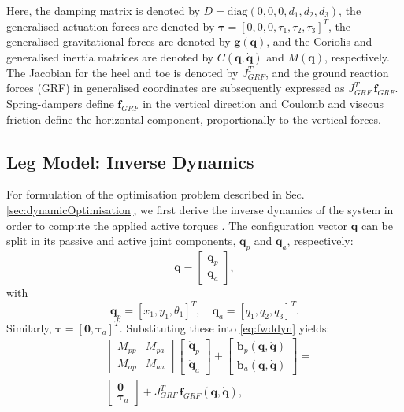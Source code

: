 \documentclass[letterpaper, 10 pt, conference]{ieeeconf}  %
\begin{document}
Here, the damping matrix is denoted by $D = \mathrm{diag} \left(0,0,0,d_1,d_2,d_3\right)$, the generalised actuation forces are denoted by $\boldsymbol{\tau} = \left[0,0,0,\tau_1,\tau_2,\tau_3\right]^T$, the generalised gravitational forces are denoted by $\mathbf{g(q)}$, and the Coriolis and generalised inertia matrices are denoted by $C\mathbf{(q, \dot q)}$ and $M(\mathbf{q})$, respectively. The Jacobian for the heel and toe is denoted by $J_{GRF}^T$, and the ground reaction forces (GRF) in generalised coordinates are subsequently expressed as $J_{GRF}^T \, \mathbf{f}_{GRF}$. Spring-dampers define $\mathbf{f}_{GRF}$ in the vertical direction and Coulomb and viscous friction define the horizontal component, proportionally to the vertical forces.

\subsection{Leg Model: Inverse Dynamics}
For formulation of the optimisation problem described in Sec. \ref{sec:dynamicOptimisation}, we first derive the inverse dynamics of the system in order to compute the applied active torques \cite{nakanishi2007inverse}. The configuration vector $\mathbf{q}$ can be split in its passive and active joint components, $\mathbf{q}_p$ and $\mathbf{q}_a$, respectively:
\begin{equation}
	\mathbf{q} =
	\begin{bmatrix}
		\mathbf{q}_p \\
		\mathbf{q}_a
	\end{bmatrix},
\end{equation}
with
\begin{equation}
	\mathbf{q}_p = [x_1,y_1,\theta_1]^T, \quad  
	\mathbf{q}_a = [q_1,q_2,q_3]^T.
\end{equation}
\noindent
Similarly, $\boldsymbol{\tau} = \left[\mathbf{0},\boldsymbol{\tau}_a\right]^T$. Substituting these into \eqref{eq:fwddyn} yields:
\begin{equation}
	\begin{aligned}
		&\left[\begin{array}{cc}  
			M_{pp} & M_{pa}\\
			M_{ap} & M_{aa}
		\end{array} \right]
		\left[\begin{array}{c}  
			\mathbf{\ddot q}_p\\
			\mathbf{\ddot q}_a
		\end{array} \right] +
		\left[\begin{array}{c}  
			\mathbf{b}_p \mathbf{(q,\dot q)}\\
			\mathbf{b}_a \mathbf{(q,\dot q)}
		\end{array} \right] 
		=\\
		&\left[\begin{array}{c}  
			\mathbf{0}\\
			\boldsymbol{\tau}_a
		\end{array} \right] 
		+
		J_{GRF}^T \, \mathbf{f}_{GRF} \left( \mathbf{q, \dot q} \right),
	\end{aligned}
	\label{eq:ik}
\end{equation}		
\end{document}
